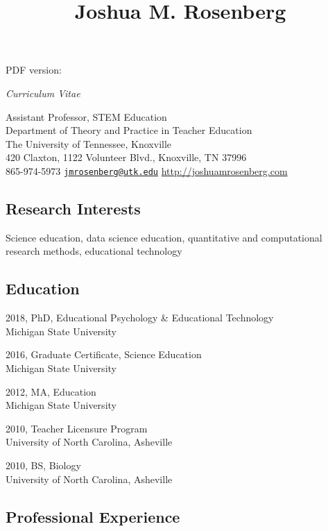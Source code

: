 \documentclass[14,]{article}
\title{Joshua M. Rosenberg}
\date{}
\begin{document}
\maketitle

PDF version:

\emph{Curriculum Vitae}

Assistant Professor, STEM Education\\
Department of Theory and Practice in Teacher Education\\
The University of Tennessee, Knoxville\\
420 Claxton, 1122 Volunteer Blvd., Knoxville, TN 37996\\
865-974-5973 \textbar{}
\href{mailto:jmrosenberg@utk.edu}{\nolinkurl{jmrosenberg@utk.edu}}
\textbar{} \url{http://joshuamrosenberg.com}

\hypertarget{research-interests}{%
\subsection{Research Interests}\label{research-interests}}

Science education, data science education, quantitative and
computational research methods, educational technology

\hypertarget{education}{%
\subsection{Education}\label{education}}

2018, PhD, Educational Psychology \& Educational Technology\\
Michigan State University

2016, Graduate Certificate, Science Education\\
Michigan State University

2012, MA, Education\\
Michigan State University

2010, Teacher Licensure Program\\
University of North Carolina, Asheville

2010, BS, Biology\\
University of North Carolina, Asheville

\hypertarget{professional-experience}{%
\subsection{Professional Experience}\label{professional-experience}}
\end{document}
